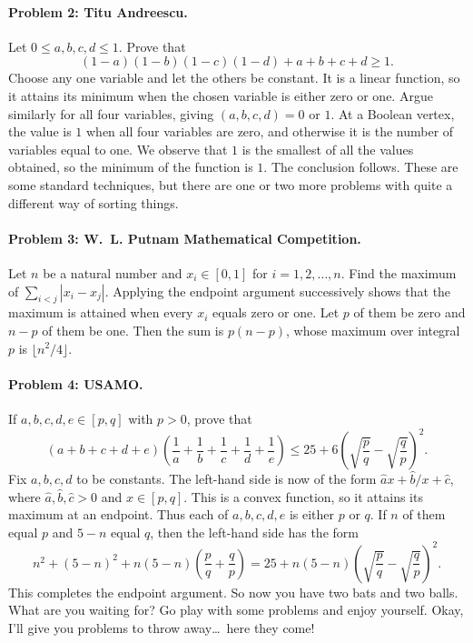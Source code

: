 \documentclass[11pt,a4paper]{article}
\begin{document}
\paragraph{Problem 2: Titu Andreescu.}
Let $0\leq a,b,c,d\leq1$. Prove that
\[(1-a)(1-b)(1-c)(1-d)+a+b+c+d\geq1.\]
Choose any one variable and let the others be constant.
It is a linear function, so it attains its minimum when the chosen variable is either zero or one.
Argue similarly for all four variables, giving $(a,b,c,d)=0$ or $1$.
At a Boolean vertex, the value is $1$ when all four variables are zero, and
otherwise it is the number of variables equal to one.
We observe that $1$ is the smallest of all the values obtained, so the minimum of the function is $1$.
The conclusion follows.
These are some standard techniques, but there are one or two more problems with quite a different way of sorting things.
\paragraph{Problem 3: W. L. Putnam Mathematical Competition.}
Let $n$ be a natural number and $x_i\in[0,1]$ for $i=1,2,\ldots,n$.
Find the maximum of $\sum_{i<j}|x_i-x_j|$.
Applying the endpoint argument successively shows that the maximum is attained when every $x_i$ equals zero or one.
Let $p$ of them be zero and $n-p$ of them be one.
Then the sum is $p(n-p)$, whose maximum over integral $p$ is $\lfloor n^2/4\rfloor$.
\paragraph{Problem 4: USAMO.}
If $a,b,c,d,e\in[p,q]$ with $p>0$, prove that
\[(a+b+c+d+e)\left(\frac1a+\frac1b+\frac1c+\frac1d+\frac1e\right)
\leq25+6\left(\sqrt{\frac pq}-\sqrt{\frac qp}\right)^2.\]
Fix $a,b,c,d$ to be constants. The left-hand side is now of the form
$\widehat a x+\widehat b/x+\widehat c$, where $\widehat a,\widehat b,\widehat c>0$ and $x\in[p,q]$.
This is a convex function, so it attains its maximum at an endpoint.
Thus each of $a,b,c,d,e$ is either $p$ or $q$.
If $n$ of them equal $p$ and $5-n$ equal $q$, then the left-hand side has the form
\[n^2+(5-n)^2+n(5-n)\left(\frac pq+\frac qp\right)
=25+n(5-n)\left(\sqrt{\frac pq}-\sqrt{\frac qp}\right)^2.\]
This completes the endpoint argument.
So now you have two bats and two balls. What are you waiting for?
Go play with some problems and enjoy yourself.
Okay, I'll give you problems to throw away\ldots\ here they come!
\end{document}
